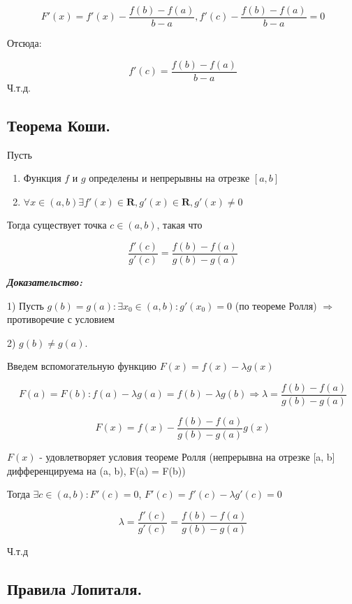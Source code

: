 \documentclass[a4paper,12pt]{article}
\theoremstyle{plain} %
\theoremstyle{definition} %
\theoremstyle{remark} %
\begin{document}
\[ F'(x) = f'(x) - \frac{f(b) - f(a)}{b - a}, f'(c) - \frac{f(b) - f(a)}{b - a} = 0\]

Отсюда:

\[ f'(c) = \frac{f(b) - f(a)}{b - a} \]
Ч.т.д.



\newpage
\subsection*{Теорема Коши.                                                                              }
Пусть
\begin{enumerate}
	\item Функция $f$ и $g$ определены и непрерывны на отрезке $[a, b]$
	\item $\forall x \in (a, b) \exists f'(x) \in \mathbf{R}, g'(x) \in \mathbf{R}, g'(x) \neq 0 $
\end{enumerate}

Тогда существует точка $c \in (a, b)$, такая что

\[
	\frac{f'(c)}{g'(c)} = \frac{f(b) - f(a)}{g(b) - g(a)}
\]

\textit{\textbf{Доказательство:}}

1) Пусть $g(b) = g(a): \exists x_0 \in (a, b): g'(x_0) = 0$ (по теореме Ролля) $\Rightarrow$ противоречие с условием

2) $g(b) \neq g(a)$.

Введем вспомогательную функцию $F(x) = f(x) - \lambda g(x)$

\[
	F(a) = F(b): f(a) - \lambda g(a) = f(b) - \lambda g(b) \Rightarrow \lambda  = \frac{f(b) - f(a)}{g(b) - g(a)}
\]

\[
	F(x) = f(x) - \frac{f(b) - f(a)}{g(b) - g(a)}g(x)
\]

$F(x)$ - удовлетворяет условия теореме Ролля (непрерывна на отрезке [a, b] дифференцируема на (a, b), F(a) = F(b))

Тогда $\exists c \in (a, b): F'(c) = 0$, $F'(c) = f'(c) - \lambda g'(c) = 0$

\[
	\lambda = \frac{f'(c)}{g'(c)} = \frac{f(b) - f(a)}{g(b) - g(a)}
\]

Ч.т.д


\newpage
\subsection*{Правила Лопиталя.                                                                          }
\end{document}
